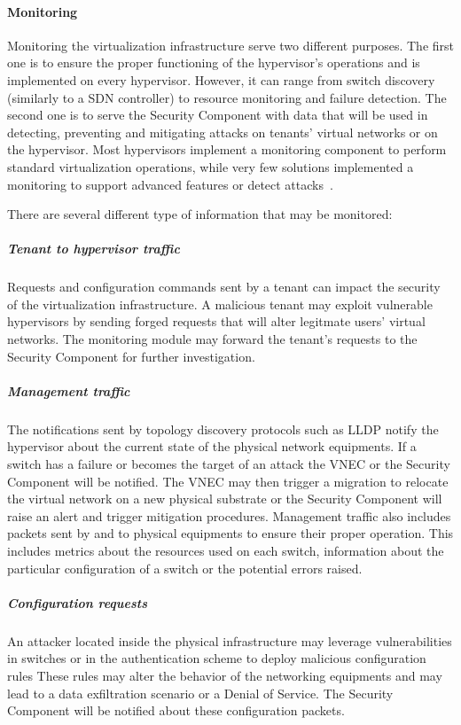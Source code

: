 \paragraph{Monitoring}
Monitoring the virtualization infrastructure serve two different purposes.
The first one is to ensure the proper functioning of the hypervisor's operations and is implemented on every hypervisor. However, it can range from switch discovery (similarly to a SDN controller) to resource monitoring and failure detection.
The second one is to serve the Security Component with data that will be used in detecting, preventing and mitigating attacks on tenants' virtual networks or on the hypervisor.
Most hypervisors implement a monitoring component to perform standard virtualization operations, while very few solutions implemented a monitoring to support advanced features or detect attacks~\cite{VeRTIGO-Corin2012a,CoVisor-Jin2015,FlowN-Drutskoy2012,AutoSlice-Bozakov2012,NVP-Koponen2014,ONVisor-Han2018}.

There are several different type of information that may be monitored:

\subparagraph{Tenant to hypervisor traffic} Requests and configuration commands sent by a tenant can impact the security of the virtualization infrastructure. A malicious tenant may exploit vulnerable hypervisors by sending forged requests that will alter legitmate users' virtual networks. The monitoring module may forward the tenant's requests to the Security Component for further investigation.

\subparagraph{Management traffic} 
The notifications sent by topology discovery protocols such as LLDP notify the hypervisor about the current state of the physical network equipments. If a switch has a failure or becomes the target of an attack the VNEC or the Security Component will be notified. The VNEC may then trigger a migration to relocate the virtual network on a new physical substrate or the Security Component will raise an alert and trigger mitigation procedures.
Management traffic also includes packets sent by and to physical equipments to ensure their proper operation.
This includes metrics about the resources used on each switch, information about the particular configuration of a switch or the potential errors raised.

\subparagraph{Configuration requests} An attacker located inside the physical infrastructure may leverage vulnerabilities in switches or in the authentication scheme to deploy malicious configuration rules These rules may alter the behavior of the networking equipments and may lead to a data exfiltration scenario or a Denial of Service.
The Security Component will be notified about these configuration packets.

